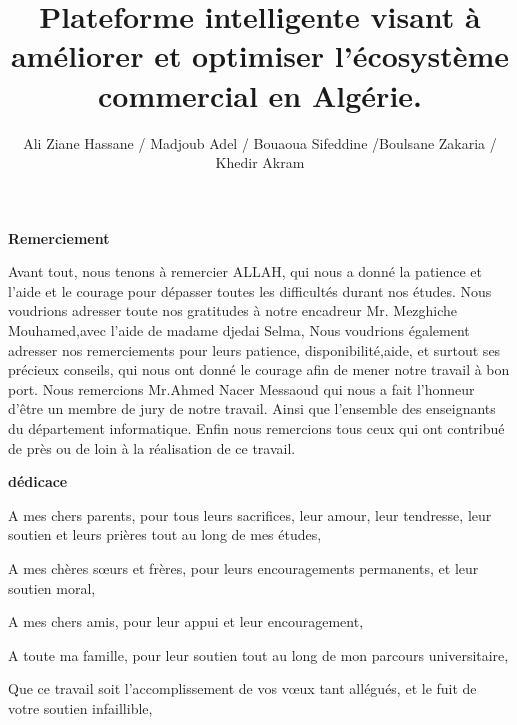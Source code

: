\documentclass[edit,12pt,a4paper,ChapStyle,oneside,doubleinterligne]{report}
\title{Plateforme intelligente visant à améliorer et optimiser l'écosystème commercial en Algérie.}
\author{Ali Ziane Hassane / Madjoub Adel / Bouaoua Sifeddine
/Boulsane Zakaria  / Khedir Akram}
\begin{document}
\maketitle 
{}
\begin{center}
    \huge{\textbf{Remerciement}}
\end{center}
\begin{large}
\phantom{hhhh}Avant tout, nous tenons à remercier ALLAH, qui nous a donné la patience et l’aide et le courage pour dépasser toutes les difficultés durant nos études.
\newline
\phantom{h}
\newline
\phantom{hhhh}Nous voudrions adresser toute nos gratitudes à notre \newline encadreur Mr. Mezghiche Mouhamed,avec l'aide de madame \newline djedai Selma, Nous voudrions également adresser nos \newline remerciements pour leurs patience, disponibilité,aide, et surtout ses précieux conseils, qui nous ont donné le courage afin de mener notre travail à bon port.
\newline
\phantom{h}
\newline
\phantom{hhhh}Nous remercions Mr.Ahmed Nacer Messaoud qui nous a fait l’honneur d’être un membre de jury de notre travail. Ainsi que l’ensemble des enseignants du département informatique.
Enfin nous remercions tous ceux qui ont contribué de près ou de loin à la réalisation de ce travail.
\end{large}
\newpage
\begin{center}
    \huge{\textbf{dédicace}}
\end{center}
\begin{large}
\phantom{hhhh}A  mes chers parents, pour tous leurs sacrifices, leur amour, leur tendresse, leur soutien et leurs prières tout au long de mes études,

A mes chères sœurs et frères, pour leurs encouragements permanents, et leur soutien moral,

A mes chers amis, pour leur appui et leur encouragement,

A toute ma famille, pour leur soutien tout au long de mon parcours universitaire,

Que ce travail soit l’accomplissement de vos vœux tant allégués, et le fuit de votre soutien infaillible,


\end{large}
\end{document}
